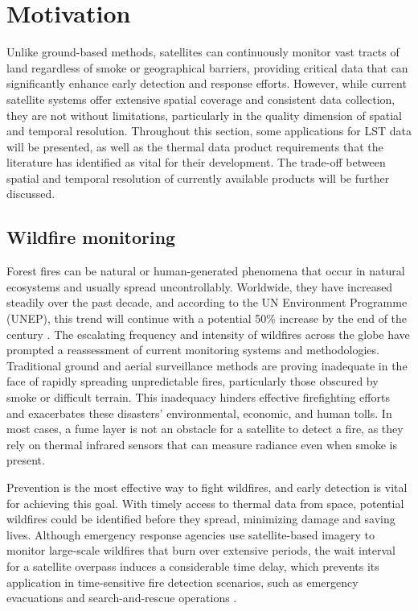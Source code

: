     
    \newpage
    

\section{Motivation}

Unlike ground-based methods, satellites can continuously monitor vast tracts of land regardless of smoke or geographical barriers, providing critical data that can significantly enhance early detection and response efforts. 
However, while current satellite systems offer extensive spatial coverage and consistent data collection, they are not without limitations, particularly in the quality dimension of spatial and temporal resolution. Throughout this section, some applications for LST data will be presented, as well as the thermal data product requirements that the literature has identified as vital for their development. The trade-off between spatial and temporal resolution of currently available products will be further discussed.
    

    \subsection{Wildfire monitoring}

    Forest fires can be natural or human-generated phenomena that occur in natural ecosystems and usually spread uncontrollably.
    Worldwide, they have increased steadily over the past decade, and according to the UN Environment Programme (UNEP), this trend will continue with a potential 50\% increase by the end of the century \cite{UNEP2021Wildfire}. 
    The escalating frequency and intensity of wildfires across the globe have prompted a reassessment of current monitoring systems and methodologies. Traditional ground and aerial surveillance methods are proving inadequate in the face of rapidly spreading unpredictable fires, particularly those obscured by smoke or difficult terrain. This inadequacy hinders effective firefighting efforts and exacerbates these disasters' environmental, economic, and human tolls. 
    In most cases, a fume layer is not an obstacle for a satellite to detect a fire, as they rely on thermal infrared sensors that can measure radiance even when smoke is present.

    Prevention is the most effective way to fight wildfires, and early detection is vital for achieving this goal. 
    With timely access to thermal data from space, potential wildfires could be identified before they spread, minimizing damage and saving lives.
    Although emergency response agencies use satellite-based imagery to monitor large-scale wildfires that burn over extensive periods, the wait interval for a satellite overpass induces a considerable time delay, which prevents its application in time-sensitive fire detection scenarios, such as emergency evacuations and search-and-rescue operations \cite{lippitt2015time}. 


